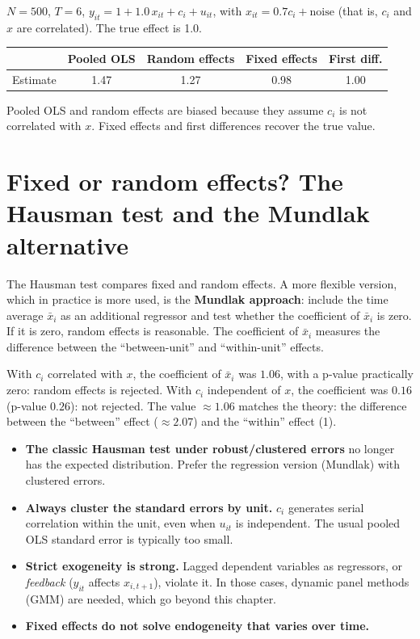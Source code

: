 \begin{simulacao}
$N=500$, $T=6$, $y_{it}=1+1.0\,x_{it}+c_i+u_{it}$, with $x_{it}=0.7c_i+\text{noise}$ (that is, $c_i$ and $x$ are correlated). The true effect is 1.0.
\begin{center}
\begin{tabular}{lcccc}
\toprule
& Pooled OLS & Random effects & Fixed effects & First diff.\\
\midrule
Estimate & 1.47 & 1.27 & 0.98 & 1.00 \\
\bottomrule
\end{tabular}
\end{center}
Pooled OLS and random effects are biased because they assume $c_i$ is not correlated with $x$. Fixed effects and first differences recover the true value.
\end{simulacao}

\section{Fixed or random effects? The Hausman test and the Mundlak alternative}
The Hausman test compares fixed and random effects. A more flexible version, which in practice is more used, is the \textbf{Mundlak approach}: include the time average $\bar x_i$ as an additional regressor and test whether the coefficient of $\bar x_i$ is zero. If it is zero, random effects is reasonable. The coefficient of $\bar x_i$ measures the difference between the ``between-unit'' and ``within-unit'' effects.

\begin{simulacao}
With $c_i$ correlated with $x$, the coefficient of $\bar x_i$ was $1.06$, with a p-value practically zero: random effects is rejected. With $c_i$ independent of $x$, the coefficient was $0.16$ (p-value $0.26$): not rejected. The value $\approx1.06$ matches the theory: the difference between the ``between'' effect ($\approx2.07$) and the ``within'' effect (1).
\end{simulacao}

\begin{atencao}
\begin{itemize}[leftmargin=1.2em]
\item \textbf{The classic Hausman test under robust/clustered errors} no longer has the expected distribution. Prefer the regression version (Mundlak) with clustered errors.
\item \textbf{Always cluster the standard errors by unit.} $c_i$ generates serial correlation within the unit, even when $u_{it}$ is independent. The usual pooled OLS standard error is typically too small.
\item \textbf{Strict exogeneity is strong.} Lagged dependent variables as regressors, or \emph{feedback} ($y_{it}$ affects $x_{i,t+1}$), violate it. In those cases, dynamic panel methods (GMM) are needed, which go beyond this chapter.
\item \textbf{Fixed effects do not solve endogeneity that varies over time.}
\end{itemize}
\end{atencao}

